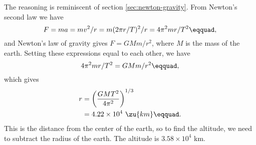 The reasoning is reminiscent of section \ref{sec:newton-gravity}. From
Newton's second law we have
\begin{equation*}
 F=ma=mv^2/r=m(2\pi r/T)^2/r=4\pi^2mr/T^2\eqquad,
\end{equation*}
and Newton's law of gravity gives
$F=GMm/r^2$, where $M$ is the mass of the earth. Setting
these expressions equal to each other, we have
\begin{equation*}
        4\pi ^2 mr/T^2  =  GMm/r^2\eqquad,
\end{equation*}
which gives
\begin{align*}
        r     &=  \left(\frac{GMT^2}{4\pi^2}\right)^{1/3}    \\
             &=    4.22\times10^4\  \zu{km}\eqquad.
\end{align*}
This is the distance from the center of the earth, so to
find the altitude, we need to subtract the radius of the
earth. The altitude is $3.58\times10^4$  km.



